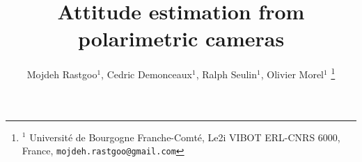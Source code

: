 \title{\LARGE \bf
Attitude estimation from polarimetric cameras}


\author{Mojdeh Rastgoo$^{1}$, Cedric Demonceaux$^{1}$, Ralph Seulin$^{1}$, Olivier Morel$^{1}$  %
\thanks{$^{1}$ Universit\'e de Bourgogne Franche-Comt\'e, Le2i VIBOT ERL-CNRS 6000, France, 
       {\tt\small mojdeh.rastgoo@gmail.com}}
}
